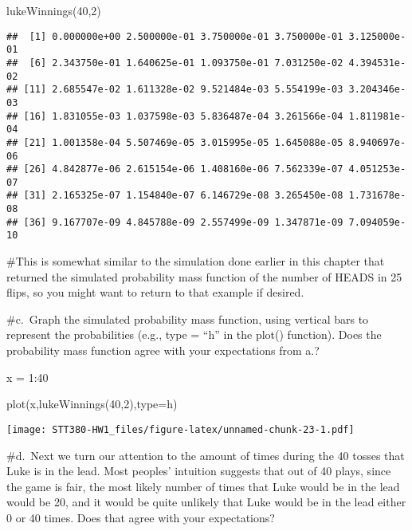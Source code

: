 \documentclass[
]{article}
\newenvironment{Shaded}{\begin{snugshade}}{\end{snugshade}}
\newcommand{\AttributeTok}[1]{\textcolor[rgb]{0.77,0.63,0.00}{#1}}
\newcommand{\DecValTok}[1]{\textcolor[rgb]{0.00,0.00,0.81}{#1}}
\newcommand{\FunctionTok}[1]{\textcolor[rgb]{0.00,0.00,0.00}{#1}}
\newcommand{\NormalTok}[1]{#1}
\newcommand{\OtherTok}[1]{\textcolor[rgb]{0.56,0.35,0.01}{#1}}
\newcommand{\SpecialCharTok}[1]{\textcolor[rgb]{0.00,0.00,0.00}{#1}}
\newcommand{\StringTok}[1]{\textcolor[rgb]{0.31,0.60,0.02}{#1}}
\begin{document}
\begin{Shaded}
\begin{Highlighting}[]
\FunctionTok{lukeWinnings}\NormalTok{(}\DecValTok{40}\NormalTok{,}\DecValTok{2}\NormalTok{)}
\end{Highlighting}
\end{Shaded}

\begin{verbatim}
##  [1] 0.000000e+00 2.500000e-01 3.750000e-01 3.750000e-01 3.125000e-01
##  [6] 2.343750e-01 1.640625e-01 1.093750e-01 7.031250e-02 4.394531e-02
## [11] 2.685547e-02 1.611328e-02 9.521484e-03 5.554199e-03 3.204346e-03
## [16] 1.831055e-03 1.037598e-03 5.836487e-04 3.261566e-04 1.811981e-04
## [21] 1.001358e-04 5.507469e-05 3.015995e-05 1.645088e-05 8.940697e-06
## [26] 4.842877e-06 2.615154e-06 1.408160e-06 7.562339e-07 4.051253e-07
## [31] 2.165325e-07 1.154840e-07 6.146729e-08 3.265450e-08 1.731678e-08
## [36] 9.167707e-09 4.845788e-09 2.557499e-09 1.347871e-09 7.094059e-10
\end{verbatim}

\#This is somewhat similar to the simulation done earlier in this
chapter that returned the simulated probability mass function of the
number of HEADS in 25 flips, so you might want to return to that example
if desired.

\#c.~Graph the simulated probability mass function, using vertical bars
to represent the probabilities (e.g., type = ``h'' in the plot()
function). Does the probability mass function agree with your
expectations from a.?

\begin{Shaded}
\begin{Highlighting}[]
\NormalTok{x }\OtherTok{=} \DecValTok{1}\SpecialCharTok{:}\DecValTok{40}

\FunctionTok{plot}\NormalTok{(x,}\FunctionTok{lukeWinnings}\NormalTok{(}\DecValTok{40}\NormalTok{,}\DecValTok{2}\NormalTok{),}\AttributeTok{type=}\StringTok{\textquotesingle{}h\textquotesingle{}}\NormalTok{)}
\end{Highlighting}
\end{Shaded}

\texttt{[image: STT380-HW1\_files/figure-latex/unnamed-chunk-23-1.pdf]}

\#d.~Next we turn our attention to the amount of times during the 40
tosses that Luke is in the lead. Most peoples' intuition suggests that
out of 40 plays, since the game is fair, the most likely number of times
that Luke would be in the lead would be 20, and it would be quite
unlikely that Luke would be in the lead either 0 or 40 times. Does that
agree with your expectations?
\end{document}
